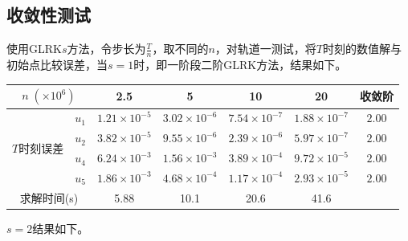 \documentclass[lang=cn,10pt,bibend=bibtex]{elegantbook}
\begin{document}
\vspace{-.8em}
\subsection{收敛性测试}
\vspace{-.8em}

使用GLRK$s$方法，令步长为$\frac{T}{n}$，取不同的$n$，对轨道一测试，将$T$时刻的数值解与初始点比较误差，当$s=1$时，即一阶段二阶GLRK方法，结果如下。

\vspace{-.5em}
\begin{table}[H]
  \centering
  \renewcommand\arraystretch{0.9}
  \begin{tabular}{cc|cccc|c}
  \multicolumn{2}{c|}{$n\;(\times 10^6)$}                  & 2.5 & 5 & 10 & 20  & 收敛阶 \\ \hline
  \multicolumn{1}{c|}{\multirow{4}{*}{$T$时刻误差}} & \multicolumn{1}{c|}{$u_1$} & $1.21\times 10^{-5}$ &  $3.02\times 10^{-6}$  & $7.54\times 10^{-7}$  & $1.88\times 10^{-7}$    &  $2.00$   \\
  \multicolumn{1}{c|}{}                         & \multicolumn{1}{c|}{$u_2$} & $3.82\times 10^{-5}$ &  $9.55\times 10^{-6}$     & $2.39\times 10^{-6}$  & $5.97\times 10^{-7}$    &  $2.00$   \\
  \multicolumn{1}{c|}{}                         & \multicolumn{1}{c|}{$u_4$} & $6.24\times 10^{-3}$ &  $1.56\times 10^{-3}$     & $3.89\times 10^{-4}$  & $9.72\times 10^{-5}$     &  $2.00$   \\
  \multicolumn{1}{c|}{}                         & \multicolumn{1}{c|}{$u_5$} & $1.86\times 10^{-3}$ &  $4.68\times 10^{-4}$     & $1.17\times 10^{-4}$  & $2.93\times 10^{-5}$     &  $2.00$  \\ \hline
  \multicolumn{2}{c|}{求解时间(s)} & 5.88 & 10.1 & 20.6 & 41.6 & 
  \end{tabular}
\end{table}
\vspace{-.8em}

$s=2$结果如下。
\end{document}
